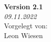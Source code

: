 \begin{titlepage}
	
	\vfill\vfill\vfill %
	
	\textbf{Version 2.1} \\
	\textit{09.11.2022} \\
	\vspace*{0.4cm}
	Vorgelegt von: \\
	Leon Wiesen
	
	 
	
	\vfill %
	
\end{titlepage}
